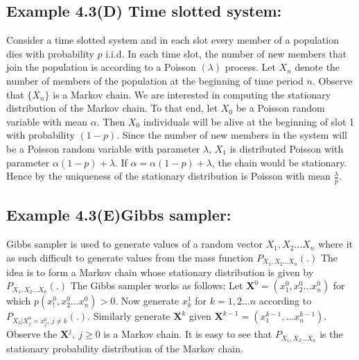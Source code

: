\documentclass[a4paper,10pt]{article}
\begin{document}
\subsection{Example 4.3(D) Time slotted system:}
Consider a time slotted system and in each slot every member of a population dies with probability $p$ i.i.d. In each time slot, the number of new members that join the population is according to a Poisson $(\lambda)$ process. Let $X_n$ denote the number of members of the population at the beginning of time period $n$. Observe that $\{X_n\}$ is a Markov chain. We are interested in computing the stationary distribution of the Markov chain. To that end, let $X_0 $ be a Poisson random variable with mean $\alpha$. Then $X_0$ individuals will be alive at the beginning of slot 1 with probability $(1-p)$. Since the number of new members in the system will be a Poisson random variable with parameter $\lambda$, $X_1$ is distributed Poisson with parameter $\alpha(1-p)+\lambda$. If $\alpha=\alpha(1-p)+\lambda$, the chain would be stationary. Hence by the uniqueness of the stationary distribution is Poisson with mean $\frac{\lambda}{p}$. 

\subsection{Example 4.3(E)Gibbs sampler:}
Gibbs sampler is used to generate values of a random vector $X_1,X_2 \hdots X_n$ where it as such difficult to generate values from the mass function $P_{X_1,X_2 \hdots X_n}(.)$ The idea is to form a Markov chain whose stationary distribution is given by $P_{X_1,X_2 \hdots X_n}(.)$ The Gibbs sampler works as follows: Let $\textbf{X}^0=(x_1^0,x_2^0 \hdots x_n^0)$  for which $p(x_!^0,x_2^0 \hdots x_n^0)>0$. Now generate $x_k^1$ for 
$k=1,2 \hdots n$ according to $P_{X_k|X_j^0=x_j^0,~j \neq k}(.)$. Similarly generate $\textbf{X}^k$ given 
 $\textbf{X}^{k-1}=(x_1^{k-1},\hdots x_n^{k-1})$. Observe the $\textbf{X}^j,~j \geq 0$ is a Markov chain. It is easy to see that $P_{X_1,X_2 \hdots X_n}$ is the stationary probability distribution of the Markov chain.
\end{document}
